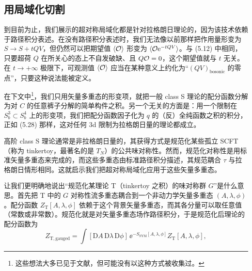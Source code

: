 \subsection{用局域化切割}

 到目前为止，我们展示的超对称局域化都是针对拉格朗日理论的，因为该技术依赖于路径积分表述。在没有路径积分表述时，我们无法像以前那样把作用量形变为 $S\to S+tQV$，但仍然可以把期望值 $\langle\mathcal{O}\rangle$ 形变为 $\langle\mathcal{O}\mathrm{e}^{-tQV}\rangle$。与 (5.12) 中相同，只要超荷 $Q$ 在所关心的态上不自发破缺、且 $Q\mathcal{O}=0$，这个期望值就与 $t$ 无关。在 $t\to+\infty$ 极限下，可观测值 $\langle\mathcal{O}\rangle$ 应当在某种意义上约化为“$(QV)_{\text{bosonic}}$ 的零点”，只要这种说法能被定义。

在下文中\footnote{这些想法大多已见于文献，但可能没有以这种方式被收集过。}，我们只用矢量多重态的形变项，就把一般 class S 理论的配分函数分解为对 $C$ 的任意裤子分解的简单构件之积。另一个无关的方面是：用一个限制在 $S^3_b\subset S^4_b$ 上的形变项，我们把配分函数因子化为 $q$ 的（反）全纯函数之积的积分，正如 (5.28) 那样，这对任何 3d 限制为拉格朗日量的理论都成立。

 高阶 class S 理论通常是非拉格朗日量的，其获得方式是规范化某些孤立 SCFT（称为 tinkertoy，最著名的是 $T_N$）的公共味对称性。然而，规范化对称性是用标准矢量多重态来完成的，而这些多重态由标准路径积分描述，其规范耦合 $\tau$ 与拉格朗日情形相同。这就启示我们把超对称局域化应用于这些矢量多重态。

让我们更明确地说出“规范化某理论 T（tinkertoy 之积）的味对称群 $G$”是什么意思。首先把 T 中的 $G$ 对称性流多重态耦合到一个非动力学矢量多重态 $(A,\lambda,\phi)$。配分函数 $Z_{\mathrm{T}}[A,\lambda,\phi]$ 依赖于这个背景矢量多重态，而其各分量可以取任意值（常数或非常数）。规范化就是对矢量多重态场作路径积分，于是规范化后理论的配分函数为
\begin{equation}
  Z_{\mathrm{T,gauged}} = \int [\mathrm{D}A\,\mathrm{D}\lambda\,\mathrm{D}\phi]\,\ee^{-S_{\mathrm{SYM}}[A,\lambda,\phi]}Z_{\mathrm{T}}[A,\lambda,\phi],
  \tag{5.41}
\end{equation}
